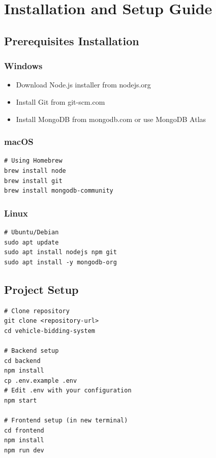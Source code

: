 \section{Installation and Setup Guide}

\subsection{Prerequisites Installation}

\subsubsection{Windows}
\begin{itemize}
    \item Download Node.js installer from nodejs.org
    \item Install Git from git-scm.com
    \item Install MongoDB from mongodb.com or use MongoDB Atlas
\end{itemize}

\subsubsection{macOS}
\begin{verbatim}
# Using Homebrew
brew install node
brew install git
brew install mongodb-community
\end{verbatim}

\subsubsection{Linux}
\begin{verbatim}
# Ubuntu/Debian
sudo apt update
sudo apt install nodejs npm git
sudo apt install -y mongodb-org
\end{verbatim}

\subsection{Project Setup}

\begin{verbatim}
# Clone repository
git clone <repository-url>
cd vehicle-bidding-system

# Backend setup
cd backend
npm install
cp .env.example .env
# Edit .env with your configuration
npm start

# Frontend setup (in new terminal)
cd frontend
npm install
npm run dev
\end{verbatim}

